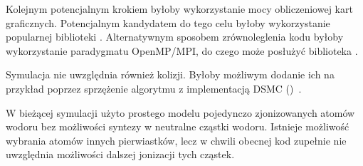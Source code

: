 Kolejnym potencjalnym krokiem byłoby wykorzystanie mocy obliczeniowej kart graficznych. Potencjalnym kandydatem do tego celu byłoby wykorzystanie popularnej biblioteki .
Alternatywnym sposobem zrównoleglenia kodu byłoby wykorzystanie paradygmatu OpenMP/MPI, do czego może posłużyć biblioteka .

Symulacja nie uwzględnia również kolizji. Byłoby możliwym dodanie ich na przykład poprzez sprzężenie algorytmu z implementacją DSMC ()~\cite{particleincell-dmsc}. %

W bieżącej symulacji użyto prostego modelu pojedynczo zjonizowanych atomów wodoru bez możliwości syntezy w neutralne cząstki wodoru. Istnieje możliwość wybrania atomów innych pierwiastków,
lecz w chwili obecnej kod zupełnie nie uwzględnia możliwości dalszej jonizacji tych cząstek.










